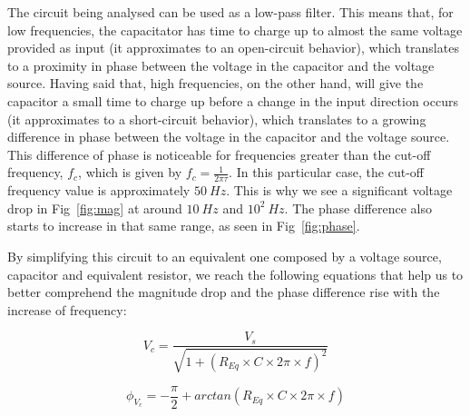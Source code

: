 The circuit being analysed can be used as a low-pass filter. This means that, for low frequencies, the capacitator has time to charge up to almost the same voltage provided as input (it approximates to an open-circuit behavior), which translates to a proximity in phase between the voltage in the capacitor and the voltage source. Having said that, high frequencies, on the other hand, will give the capacitor a small time to charge up before a change in the input direction occurs (it approximates to a short-circuit behavior), which translates to a growing difference in phase between the voltage in the capacitor and the voltage source. This difference of phase is noticeable for frequencies greater than the cut-off frequency, $f_c$, which is given by $f_c = \frac{1}{2\pi\tau}$. In this particular case, the cut-off frequency value is approximately $50~Hz$. This is why we see a significant voltage drop in Fig~\ref{fig:mag} at around $10~Hz$ and $10^2~Hz$. The phase difference also starts to increase in that same range, as seen in Fig~\ref{fig:phase}.

By simplifying this circuit to an equivalent one composed by a voltage source, capacitor and equivalent resistor, we reach the following equations that help us to better comprehend the magnitude drop and the phase difference rise with the increase of frequency:

\begin{equation}
  V_c = \frac{V_s}{\sqrt{1 + (R_{Eq}\times C\times 2\pi\times f)^2}}
  \label{eq:equivalent1}
\end{equation}

\begin{equation}
  \phi_{V_c} = -\frac{\pi}{2} + arctan(R_{Eq}\times C\times 2\pi\times f)
  \label{eq:equivalent2}
\end{equation}

